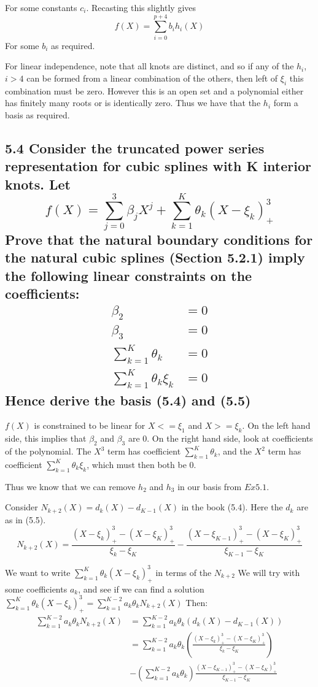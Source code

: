 For some constants $c_i$. Recasting this slightly gives
$$f(X) = \sum_{i=0}^{p+4} b_i h_i(X)$$ 
For some $b_i$ as required.

For linear independence, note that all knots are distinct, and so if any of the $h_i$, $i>4$ can be formed from a linear combination of the others, then left of $\xi_i$ this combination must be zero. However this is an open set and a polynomial either has finitely many roots or is identically zero. Thus we have that the $h_i$ form a basis as required. 


\subsection*{5.4 Consider the truncated power series representation for cubic splines with K interior knots. Let
$$f(X) = \sum_{j=0}^3 \beta_j X^j + \sum_{k=1}^K \theta_k (X - \xi_k)^3_+$$
Prove that the natural boundary conditions for the natural cubic splines (Section 5.2.1) imply the following linear constraints on the coefficients:
\begin{align*}
    \beta_2 &= 0 \\
    \beta_3 &= 0 \\
    \sum_{k=1}^K \theta_k &= 0 \\
    \sum_{k=1}^K \theta_k \xi_k  &= 0
\end{align*}
Hence derive the basis (5.4) and (5.5)
}

$f(X)$ is constrained to be linear for $X <= \xi_1$ and $X >= \xi_k$.
On the left hand side, this implies that $\beta_2$ and $\beta_3$ are $0$.
On the right hand side, look at coefficients of the polynomial.
The $X^3$ term has coefficient $\sum_{k=1}^K \theta_k$, and the $X^2$ term has coefficient $\sum_{k=1}^K \theta_k \xi_k $, which must then both be $0$.

Thus we know that we can remove $h_2$ and $h_3$ in our basis from $Ex 5.1$.

Consider $N_{k+2}(X) = d_k(X) - d_{K-1}(X)$ in the book (5.4). Here the $d_k$ are as in (5.5).
$$N_{k+2}(X) = \frac{(X - \xi_k)^3_+ - (X - \xi_K)^3_+}{\xi_k - \xi_K} - \frac{(X - \xi_{K-1})^3_+ - (X - \xi_K)^3_+}{\xi_{K-1} - \xi_K}$$

We want to write $\sum_{k=1}^K \theta_k (X - \xi_k)^3_+$ in terms of the $N_{k+2}$
We will try with some coefficients $a_k$, and see if we can find a solution $\sum_{k=1}^K \theta_k (X - \xi_k)^3_+ = \sum_{k=1}^{K-2} a_k \theta_k N_{k+2}(X)$
Then:
\begin{align*}
    \sum_{k=1}^{K-2}a_k \theta_k N_{k+2}(X) &= \sum_{k=1}^{K-2 }a_k \theta_k \left( d_k(X) - d_{K-1}(X) \right) \\
    &= \sum_{k=1}^{K-2 }a_k \theta_k \left( \frac{(X - \xi_k)^3_+ - (X - \xi_K)^3_+}{\xi_k - \xi_K} \right) \\ &- \left(\sum_{k=1}^{K-2 }a_k \theta_k \right) \frac{(X - \xi_{K-1})^3_+ - (X  - \xi_K)^3_+}{\xi_{K-1} - \xi_K}
\end{align*}

